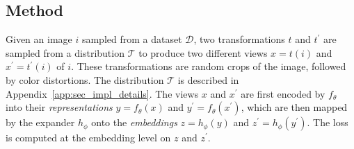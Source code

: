 \documentclass{article}
\begin{document}
\subsection{Method} \label{sec:method_details}

Given an image $i$ sampled from a dataset $\mathcal{D}$, two transformations $t$ and $t^{\prime}$ are sampled from a distribution $\mathcal{T}$ to produce two different views $x = t(i)$ and $x^{\prime} = t^{\prime}(i)$ of $i$. These transformations are random crops of the image, followed by color distortions. The distribution $\mathcal{T}$ is described in Appendix~\ref{app:sec_impl_details}. The views $x$ and $x^{\prime}$ are first encoded by $f_{\theta}$ into their {\em representations} $y = f_{\theta}(x)$ and $y^{\prime} = f_{\theta}(x^{\prime})$, which are then mapped by the expander $h_{\phi}$ onto the {\em embeddings} $z = h_{\phi}(y)$ and $z^{\prime} = h_{\phi}(y^{\prime})$. The loss is computed at the embedding level on $z$ and $z^{\prime}$.
\end{document}
